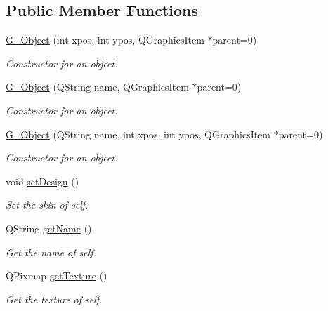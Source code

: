 \subsection*{Public Member Functions}
\begin{DoxyCompactItemize}
\item 
\hyperlink{class_g___object_aa64de9d24e8b67e33e537657030a813d}{G\+\_\+\+Object} (int xpos, int ypos, Q\+Graphics\+Item $\ast$parent=0)
\begin{DoxyCompactList}\small\item\em Constructor for an object. \end{DoxyCompactList}\item 
\hyperlink{class_g___object_a9cff8a6000e33f13856af0c3eed47cc6}{G\+\_\+\+Object} (Q\+String name, Q\+Graphics\+Item $\ast$parent=0)
\begin{DoxyCompactList}\small\item\em Constructor for an object. \end{DoxyCompactList}\item 
\hyperlink{class_g___object_a8bb5382b74b1012eccc2b0005895b9a6}{G\+\_\+\+Object} (Q\+String name, int xpos, int ypos, Q\+Graphics\+Item $\ast$parent=0)
\begin{DoxyCompactList}\small\item\em Constructor for an object. \end{DoxyCompactList}\item 
\hypertarget{class_g___object_ad9241749fb08c9e3974c3759f98caa80}{}void \hyperlink{class_g___object_ad9241749fb08c9e3974c3759f98caa80}{set\+Design} ()\label{class_g___object_ad9241749fb08c9e3974c3759f98caa80}

\begin{DoxyCompactList}\small\item\em Set the skin of self. \end{DoxyCompactList}\item 
Q\+String \hyperlink{class_g___object_a945031891a56f388325b8d2920f47737}{get\+Name} ()
\begin{DoxyCompactList}\small\item\em Get the name of self. \end{DoxyCompactList}\item 
Q\+Pixmap \hyperlink{class_g___object_a0996523a11fefccaff0cc05ad15121bd}{get\+Texture} ()
\begin{DoxyCompactList}\small\item\em Get the texture of self. \end{DoxyCompactList}\end{DoxyCompactItemize}
